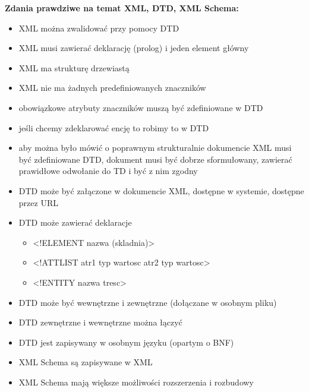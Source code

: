 \vspace{0.2cm}
\noindent \textbf {Zdania prawdziwe na temat XML, DTD, XML Schema:} 
\begin{itemize}
	\item{XML można zwalidować przy pomocy DTD}
	\item{XML musi zawierać deklarację (prolog) i jeden element główny}
    \item{XML ma strukturę drzewiastą}
    \item{XML nie ma żadnych predefiniowanych znaczników}
    \item{obowiązkowe atrybuty znaczników muszą być zdefiniowane w DTD}
    \item{jeśli chcemy zdeklarować encję to robimy to w DTD}
    \item{aby można było mówić o poprawnym strukturalnie dokumencie XML musi być zdefiniowane DTD, dokument musi być dobrze sformułowany, zawierać prawidłowe odwołanie do TD i być z nim zgodny}
    \item{DTD może być załączone w dokumencie XML, dostępne w systemie, dostępne przez URL}
    \item{DTD może zawierać deklaracje}
    \begin{itemize}
    	\item{<!ELEMENT nazwa (skladnia)>}
    	\item{<!ATTLIST atr1 typ wartosc atr2 typ wartosc>}
        \item{<!ENTITY nazwa tresc>}
	\end{itemize}
    \item{DTD może być wewnętrzne i zewnętrzne (dołączane w osobnym pliku)}
    \item{DTD zewnętrzne i wewnętrzne można łączyć}
    \item{DTD jest zapisywany w osobnym języku (opartym o BNF)}
    \item{XML Schema są zapisywane w XML}
    \item{XML Schema mają większe możliwości rozszerzenia i rozbudowy}
    
    
\end{itemize}    